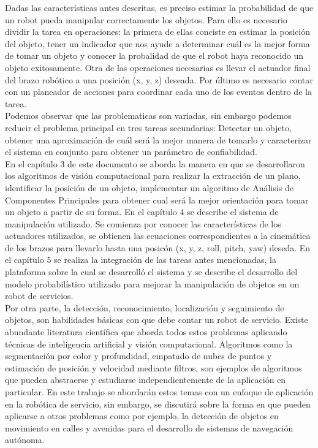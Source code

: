 \documentclass[a4paper, openright, 12pt]{report}
\begin{document}
		Dadas las características antes descritas, es preciso estimar la probabilidad de que un robot pueda manipular correctamente los objetos. Para ello es necesario dividir la tarea en operaciones: la primera de ellas conciste en estimar la posición del objeto, tener un indicador que nos ayude a determinar cuál es la mejor forma de tomar un objeto y conocer la probalidad de que el robot haya reconocido un objeto exitosamente. Otra de las operaciones necesarias es llevar el actuador final del brazo robótico a una posición (x, y, z) deseada. Por último es necesario contar con un planeador de acciones para coordinar cada uno de los eventos dentro de la tarea.\\


		Podemos observar que las problematicas son variadas, sin embargo podemos reducir el problema principal en tres tareas secundarias: Detectar un objeto, obtener una aproximación de cuál será la mejor manera de tomarlo y caracterizar el sistema en conjunto para obtener un parámetro de confiabilidad.\\

		En el capítulo 3 de este documento se aborda la manera en que se desarrollaron los algoritmos de visión computacional para realizar la extracción de un plano, identificar la posición de un objeto, implementar un algoritmo de Análisis de Componentes Principales para obtener cual será la mejor orientación para tomar un objeto a partir de su forma. En el capítulo 4 se describe el sistema de manipulación utilizado. Se comienza por conocer las características de los actuadores utilizados, se obtienen las ecuaciones correspondientes a la cinemática de los brazos para llevarlo hasta una posicón (x, y, z, roll, pitch, yaw) deseda. En el capítulo 5 se realiza la integración de las tareas antes mencionadas, la plataforma sobre la cual se desarrolló el sistema y se describe el desarrollo del modelo probabilístico utilizado para mejorar la manipulación de objetos en un robot de servicios.\\

		Por otra parte, la detección, reconocimiento, localización y seguimiento de objetos, son habilidades básicas con que debe contar un robot de servicio. Existe abundante literatura científica que aborda todos estos problemas aplicando técnicas de inteligencia artificial y visión computacional. Algoritmos como la segmentación por color y profundidad, empatado de nubes de puntos y estimación de posición y velocidad mediante filtros, son ejemplos de algoritmos que pueden abstraerse y estudiarse independientemente de la aplicación en particular. En este trabajo se abordarán estos temas con un enfoque de aplicación en la robótica de servicio, sin embargo, se discutirá sobre la forma en que pueden aplicarse a otros problemas como por ejemplo, la detección de objetos en movimiento en calles y avenidas para el desarrollo de sistemas de navegación autónoma.\\
\end{document}
